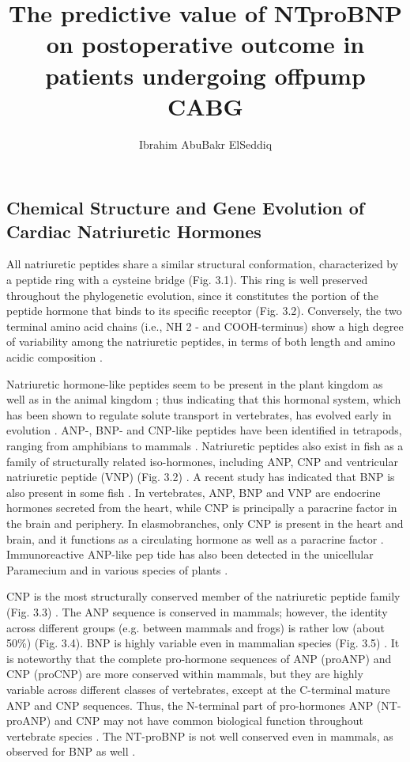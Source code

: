 \documentclass[14pt,a4paper,onecolumn]{extarticle}
\author{Ibrahim AbuBakr ElSeddiq}
\title{The predictive value of NTproBNP on postoperative outcome in patients undergoing offpump CABG}
\begin{document}
\maketitle
\clearpage



\subsection{Chemical Structure and Gene Evolution of Cardiac Natriuretic Hormones
}
All natriuretic peptides share a similar structural conformation, characterized by a peptide ring with a cysteine bridge (Fig. 3.1). This ring is well preserved throughout the phylogenetic evolution, since it constitutes the portion of the peptide hormone that binds to its specific receptor (Fig. 3.2). Conversely, the two terminal amino acid chains (i.e., NH 2 - and COOH-terminus) show a high degree of variability among the natriuretic peptides, in terms of both length and amino acidic composition \citep{1}.

Natriuretic hormone-like peptides seem to be present in the plant kingdom as well as in the animal kingdom \citep{1} \citep{2} \citep{3}; thus indicating that this hormonal system, which has been shown to regulate solute transport in vertebrates, has evolved early in evolution \citep{1} \citep{2} \citep{3} \citep{4} \citep{5} \citep{6}.  ANP-, BNP- and CNP-like peptides have been identified in tetrapods, ranging from amphibians to mammals \citep{1}. Natriuretic peptides also exist in fish as a family of structurally related iso-hormones, including ANP, CNP and ventricular natriuretic peptide (VNP) (Fig. 3.2) \citep{1}. A recent study has indicated that BNP is also present in some fish \citep{6}. In vertebrates, ANP, BNP and VNP are endocrine hormones secreted from the heart, while CNP is principally a paracrine factor in the brain and periphery. In elasmobranches, only CNP is present in the heart and brain, and it functions as a circulating hormone as well as a paracrine factor \citep{1}. Immunoreactive ANP-like pep tide has also been detected in the unicellular Paramecium and in various species of plants \citep{1}.

CNP is the most structurally conserved member of the natriuretic peptide family (Fig. 3.3) \citep{1} \citep{4}. The ANP sequence is conserved in mammals; however, the identity across different groups (e.g. between mammals and frogs) is rather low (about 50\%) (Fig. 3.4). BNP is highly variable even in mammalian species (Fig. 3.5) \citep{1} \citep{4}.  It is noteworthy that the complete pro-hormone sequences of ANP (proANP) and CNP (proCNP) are more conserved within mammals, but they are highly variable across different classes of vertebrates, except at the C-terminal mature ANP and CNP sequences.  Thus, the N-terminal part of pro-hormones ANP (NT-proANP) and CNP may not have common biological function throughout vertebrate species \citep{1}. The NT-proBNP is not well conserved even in mammals, as observed for BNP as well \citep{1}.
\end{document}
